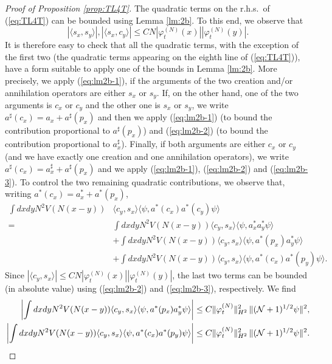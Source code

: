 \documentclass[11pt,a4paper]{article}
\newcommand{\cN}{{\cal N}}
\begin{document}
\begin{proof}[Proof of Proposition \ref{prop:TL4T}]
The quadratic terms on the r.h.s.\ of (\ref{eq:TL4T}) can be bounded using Lemma \ref{lm:2b}. To this end, we observe that
\[ |\langle s_x, s_y \rangle| , |\langle s_x, c_y \rangle| \leq C N |\varphi^{(N)}_t (x)| |\varphi_t^{(N)} (y)|. \]
It is therefore easy to check that all the quadratic terms, with the exception of the first two (the quadratic terms appearing on the eighth line of (\ref{eq:TL4T})), have a form suitable to apply one of the bounds in Lemma \ref{lm:2b}. More precisely, we apply (\ref{eq:lm2b-1}), if the arguments of the two creation and/or annihilation operators are either $s_x$ or $s_y$. If, on the other hand, one of the two arguments is $c_x$ or $c_y$ and the other one is $s_x$ or $s_y$, we write $a^\sharp (c_x) = a_x + a^\sharp (p_x)$ and then we apply (\ref{eq:lm2b-1}) (to bound the contribution proportional to $a^\sharp (p_x)$) and (\ref{eq:lm2b-2}) (to bound the contribution proportional to $a_x^\sharp$). Finally, if both arguments are either $c_x$ or $c_y$ (and we have  exactly one creation and one annihilation operators), we write $a^\sharp (c_x) = a^\sharp_x + a^\sharp (p_x)$ and we apply (\ref{eq:lm2b-1}), (\ref{eq:lm2b-2}) and (\ref{eq:lm2b-3}). To control the two remaining quadratic contributions, we observe that, writing $a^* (c_x)= a^*_x + a^* (p_x)$,  
\begin{equation} \begin{split}\label{eq:4-2}  \int dx dy N^2 V(N (x-y)) & \langle c_y , s_x \rangle \langle \psi , a^* (c_x) a^* (c_y) \psi \rangle \\ =\; & \int dx dy N^2 V(N (x-y)) \langle c_y , s_x \rangle \langle \psi , a^*_x a^*_y \psi \rangle
\\ &+  \int dx dy N^2 V(N (x-y)) \langle c_y , s_x \rangle \langle \psi , a^* (p_x) a^*_y \psi\rangle
\\ &+  \int dx dy N^2 V(N (x-y)) \langle c_y , s_x \rangle \langle \psi , a^* (c_x) a^*(p_y) \psi \rangle. \end{split} \end{equation}
Since $|\langle c_y , s_x \rangle| \leq C N |\varphi^{(N)}_t (x)| |\varphi^{(N)}_t (y)|$, the last two terms can be bounded (in absolute value) using (\ref{eq:lm2b-2}) and (\ref{eq:lm2b-3}), respectively. We find
\[ \begin{split}
\left|   \int dx dy N^2 V(N (x-y)) \langle c_y , s_x \rangle \langle \psi ,
a^* (p_x) a^*_y \psi\rangle \right| &\leq C \| \varphi_t^{(N)} \|_{H^2}^2 \,
\| (\cN+1)^{1/2} \psi \|^2, \\ 
\left|   \int dx dy N^2 V(N (x-y)) \langle c_y , s_x \rangle \langle \psi , a^* (c_x) a^* (p_y) \psi\rangle \right| &\leq C  \| \varphi_t^{(N)} \|_{H^2}^2 \, \| (\cN+1)^{1/2} \psi \|^2. 

\end{split}\]
\end{proof}
\end{document}

